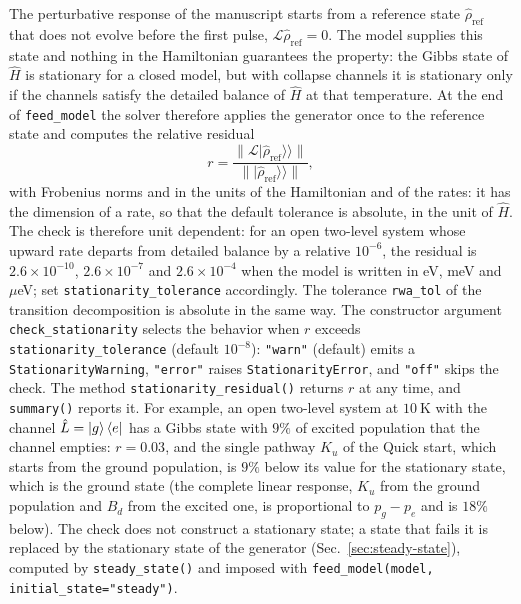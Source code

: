 \documentclass[11pt]{article}
\newcommand{\kket}[1]{|#1\rangle\!\rangle}
\begin{document}
The perturbative response of the manuscript starts from a reference state $\hat\rho_{\mathrm{ref}}$ that does not evolve before the first pulse, $\mathcal{L}\hat\rho_{\mathrm{ref}}=0$. The model supplies this state and nothing in the Hamiltonian guarantees the property: the Gibbs state of $\hat H$ is stationary for a closed model, but with collapse channels it is stationary only if the channels satisfy the detailed balance of $\hat H$ at that temperature. At the end of \texttt{feed\_model} the solver therefore applies the generator once to the reference state and computes the relative residual
\begin{equation}
    r=\frac{\lVert\mathcal{L}\kket{\hat\rho_{\mathrm{ref}}}\rVert}{\lVert\kket{\hat\rho_{\mathrm{ref}}}\rVert},
\end{equation}
with Frobenius norms and in the units of the Hamiltonian and of the rates: it has the dimension of a rate, so that the default tolerance is absolute, in the unit of $\hat H$. The check is therefore unit dependent: for an open two-level system whose upward rate departs from detailed balance by a relative $10^{-6}$, the residual is $2.6\times10^{-10}$, $2.6\times10^{-7}$ and $2.6\times10^{-4}$ when the model is written in eV, meV and $\mu$eV; set \texttt{stationarity\_tolerance} accordingly. The tolerance \texttt{rwa\_tol} of the transition decomposition is absolute in the same way. The constructor argument \texttt{check\_stationarity} selects the behavior when $r$ exceeds \texttt{stationarity\_tolerance} (default $10^{-8}$): \texttt{"warn"} (default) emits a \texttt{StationarityWarning}, \texttt{"error"} raises \texttt{StationarityError}, and \texttt{"off"} skips the check. The method \texttt{stationarity\_residual()} returns $r$ at any time, and \texttt{summary()} reports it. For example, an open two-level system at $10~\mathrm{K}$ with the channel $\hat L=\ket{g}\bra{e}$ has a Gibbs state with $9\%$ of excited population that the channel empties: $r=0.03$, and the single pathway $K_u$ of the Quick start, which starts from the ground population, is $9\%$ below its value for the stationary state, which is the ground state (the complete linear response, $K_u$ from the ground population and $B_d$ from the excited one, is proportional to $p_g-p_e$ and is $18\%$ below). The check does not construct a stationary state; a state that fails it is replaced by the stationary state of the generator (Sec.~\ref{sec:steady-state}), computed by \texttt{steady\_state()} and imposed with \texttt{feed\_model(model, initial\_state="steady")}.
\end{document}
